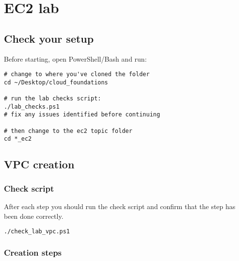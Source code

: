 \chapter{EC2 lab}

\section{Check your setup}

Before starting, open PowerShell/Bash and run:
\begin{verbatim}
# change to where you've cloned the folder
cd ~/Desktop/cloud_foundations

# run the lab checks script:
./lab_checks.ps1
# fix any issues identified before continuing

# then change to the ec2 topic folder
cd *_ec2
\end{verbatim}

\section{VPC creation}

\subsection{Check script}

After each step you should run the check script and confirm that the step has been done correctly.
\begin{verbatim}
./check_lab_vpc.ps1
\end{verbatim}

\subsection{Creation steps}

